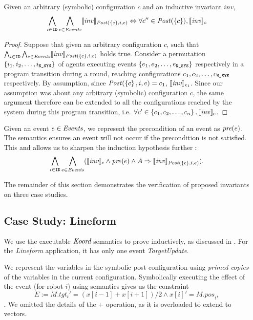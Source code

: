 \begin{lemma}
   \label{noninter}
Given an arbitrary (symbolic) configuration $c$ and an inductive invariant $\mathit{inv}$,
   {\small
   $$\bigwedge_{i\in \texttt{ID}}\bigwedge_{e \in \mathit{Events}}  \llbracket\mathit{inv}\rrbracket_{\mathit{Post}(\left\{c\right\}, i, e)} \Leftrightarrow \forall c'' \in \mathit{Post}(\left\{c\right\}), \llbracket\mathit{inv}\rrbracket_{c}$$ }
\end{lemma}
\begin{proof}
Suppose that given an arbitrary configuration $c$, such that $\bigwedge_{i\in \texttt{ID}}\bigwedge_{e \in \mathit{Events}} \llbracket\mathit{inv}\rrbracket_{\mathit{Post}(\left\{c\right\}, i, e)}$ holds true. Consider a permutation $\left\{i_1,i_2,\ldots,i_{\texttt{N\_SYS}}\right\}$ of agents executing events $\left\{e_1, e_2, \ldots , e_{\texttt{N\_SYS}}\right\}$ respectively in a program transition during a round, reaching configurations $c_1, c_2, \ldots, c_{\texttt{N\_SYS}}$ respectively. By assumption, since $\mathit{Post}(\left\{c\right\},i,e) = c_1$, $\llbracket\mathit{inv}\rrbracket_{c_1}$. Since our assumption was about any arbitrary (symbolic) configuration $c$, the same argument therefore can be extended to all the configurations reached by the system during this program transition, i.e. $\forall c' \in \left\{c_1, c_2, \ldots, c_n\right\}, \llbracket\mathit{inv}\rrbracket_{c}$.
\end{proof}

Given an event $e\in \mathit{Events}$, we represent the precondition of an event as $\mathit{pre}(e)$. The semantics ensures an event will not occur if the precondition is not satisfied. This and  allows us to sharpen the induction hypothesis further :
    $$ \bigwedge_{i\in \texttt{ID}} \bigwedge_{e \in \mathit{Events}}  (\llbracket\mathit{inv}\rrbracket_{c} \wedge \mathit{pre}(e) \wedge A \Rightarrow \llbracket\mathit{inv}\rrbracket_{\mathit{Post}(\left\{c\right\}, i, e) }).$$


The remainder of this section demonstrates the verification of proposed invariants on three case studies.


\subsection{Case Study: Lineform}
 We use the executable $\emph{Koord}$ semantics to prove  inductively, as discussed in . For the \emph{Lineform} application, it has only one event \emph{TargetUpdate}.

We represent the variables in the symbolic post configuration using \emph{primed copies} of the variables in the current configuration. Symbolically executing the effect of the event (for robot $i$) using \K semantics gives us the constraint $$E := \mathit{M.tgt_i}' = (x[i-1] + x[i+1])/2 \wedge x[i]' = \mathit{M.pos}_i,$$. We omitted the details of the $+$ operation, as it is overloaded to extend to vectors.

